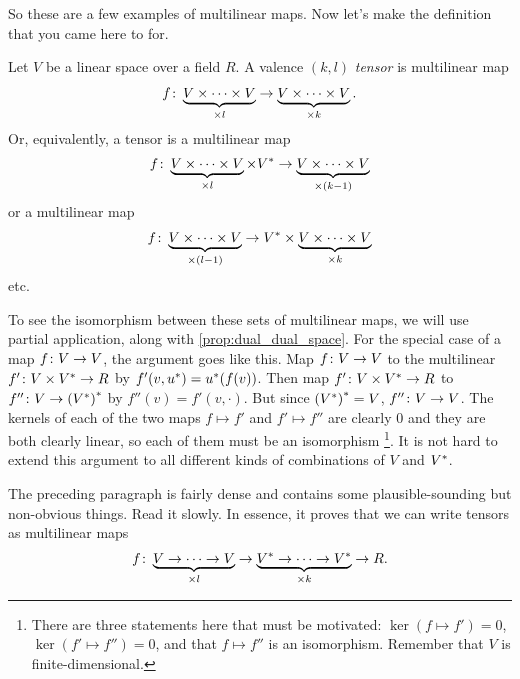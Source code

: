 \documentclass[english, 12pt]{article}
\begin{document}
So these are a few examples of multilinear maps.
Now let's make the definition that you came here to for.
\begin{definition}\label{def:tensor}
	Let \(V\) be a linear space over a field \(R\).
	A valence \((k, l)\) \emph{tensor} is multilinear map
	\begin{align*}
		f \colon \underbrace{V \times \dots \times V}_{\times l} \to \underbrace{V \times \dots \times V}_{\times k}.
	\end{align*}
	Or, equivalently, a tensor is a multilinear map
	\begin{align*}
		f \colon \underbrace{V \times \dots \times V}_{\times l} \times {V}^{\ast} \to \underbrace{V \times \dots \times V}_{\times (k - 1)}
	\end{align*}
	or a multilinear map
	\begin{align*}
		f \colon \underbrace{V \times \dots \times V}_{\times (l - 1)} \to {V}^{\ast} \times \underbrace{V \times \dots \times V}_{\times k}
	\end{align*}
	etc.
\end{definition}
To see the isomorphism between these sets of multilinear maps, we will use partial application, along with \cref{prop:dual_dual_space}.
For the special case of a map \(f \colon V \to V\), the argument goes like this.
Map \(f \colon V \to V\) to the multilinear \(f' \colon V \times {V}^{\ast} \to R\) by \(f'(v, {u}^{\ast}) = {u}^{\ast}(f(v))\).
Then map \(f' \colon V \times {V}^{\ast} \to R\) to \(f'' \colon V \to {({V}^{\ast})}^{\ast}\) by \(f''(v) = f'(v, \cdot)\).
But since \({({V}^{\ast})}^{\ast} = V\), \(f'' \colon V \to V\).
The kernels of each of the two maps \(f \mapsto f'\) and \(f' \mapsto f''\) are clearly \(0\) and they are both clearly linear, so each of them must be an isomorphism%
\footnote{%
There are three statements here that must be motivated: \(\operatorname{ker}(f \mapsto f') = 0\), \(\operatorname{ker}(f' \mapsto f'') = 0\), and that \(f \mapsto f''\) is an isomorphism.
Remember that \(V\) is finite-dimensional.
}.
It is not hard to extend this argument to all different kinds of combinations of \(V\) and \({V}^{\ast}\).

The preceding paragraph is fairly dense and contains some plausible-sounding but non-obvious things.
Read it slowly.
In essence, it proves that we can write tensors as multilinear maps
\begin{align*}
	f \colon \underbrace{V \to \dots \to V}_{\times l} \to \underbrace{{V}^{\ast} \to \dots \to {V}^{\ast}}_{\times k} \to R.
\end{align*}
\end{document}
